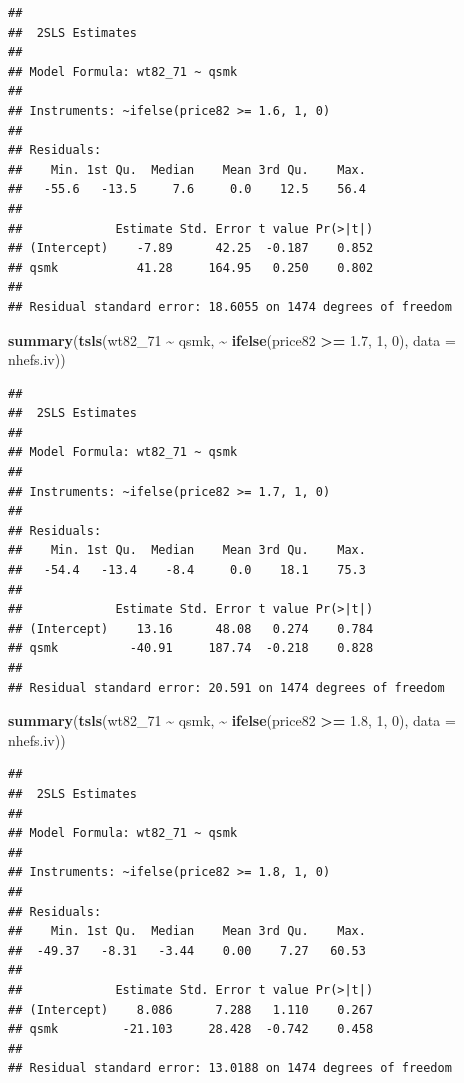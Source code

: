 \documentclass[
  10pt,
]{book}
\newenvironment{Shaded}{\begin{snugshade}}{\end{snugshade}}
\newcommand{\DataTypeTok}[1]{\textcolor[rgb]{0.13,0.29,0.53}{#1}}
\newcommand{\DecValTok}[1]{\textcolor[rgb]{0.00,0.00,0.81}{#1}}
\newcommand{\FloatTok}[1]{\textcolor[rgb]{0.00,0.00,0.81}{#1}}
\newcommand{\KeywordTok}[1]{\textcolor[rgb]{0.13,0.29,0.53}{\textbf{#1}}}
\newcommand{\NormalTok}[1]{#1}
\newcommand{\OperatorTok}[1]{\textcolor[rgb]{0.81,0.36,0.00}{\textbf{#1}}}
\newcommand{\StringTok}[1]{\textcolor[rgb]{0.31,0.60,0.02}{#1}}
\begin{document}
\begin{verbatim}
## 
##  2SLS Estimates
## 
## Model Formula: wt82_71 ~ qsmk
## 
## Instruments: ~ifelse(price82 >= 1.6, 1, 0)
## 
## Residuals:
##    Min. 1st Qu.  Median    Mean 3rd Qu.    Max. 
##   -55.6   -13.5     7.6     0.0    12.5    56.4 
## 
##             Estimate Std. Error t value Pr(>|t|)
## (Intercept)    -7.89      42.25  -0.187    0.852
## qsmk           41.28     164.95   0.250    0.802
## 
## Residual standard error: 18.6055 on 1474 degrees of freedom
\end{verbatim}

\begin{Shaded}
\begin{Highlighting}[]
\KeywordTok{summary}\NormalTok{(}\KeywordTok{tsls}\NormalTok{(wt82\_}\DecValTok{71} \OperatorTok{\textasciitilde{}}\StringTok{ }\NormalTok{qsmk, }\OperatorTok{\textasciitilde{}}\StringTok{ }\KeywordTok{ifelse}\NormalTok{(price82 }\OperatorTok{\textgreater{}=}\StringTok{ }\FloatTok{1.7}\NormalTok{, }\DecValTok{1}\NormalTok{, }\DecValTok{0}\NormalTok{), }\DataTypeTok{data =}\NormalTok{ nhefs.iv))}
\end{Highlighting}
\end{Shaded}

\begin{verbatim}
## 
##  2SLS Estimates
## 
## Model Formula: wt82_71 ~ qsmk
## 
## Instruments: ~ifelse(price82 >= 1.7, 1, 0)
## 
## Residuals:
##    Min. 1st Qu.  Median    Mean 3rd Qu.    Max. 
##   -54.4   -13.4    -8.4     0.0    18.1    75.3 
## 
##             Estimate Std. Error t value Pr(>|t|)
## (Intercept)    13.16      48.08   0.274    0.784
## qsmk          -40.91     187.74  -0.218    0.828
## 
## Residual standard error: 20.591 on 1474 degrees of freedom
\end{verbatim}

\begin{Shaded}
\begin{Highlighting}[]
\KeywordTok{summary}\NormalTok{(}\KeywordTok{tsls}\NormalTok{(wt82\_}\DecValTok{71} \OperatorTok{\textasciitilde{}}\StringTok{ }\NormalTok{qsmk, }\OperatorTok{\textasciitilde{}}\StringTok{ }\KeywordTok{ifelse}\NormalTok{(price82 }\OperatorTok{\textgreater{}=}\StringTok{ }\FloatTok{1.8}\NormalTok{, }\DecValTok{1}\NormalTok{, }\DecValTok{0}\NormalTok{), }\DataTypeTok{data =}\NormalTok{ nhefs.iv))}
\end{Highlighting}
\end{Shaded}

\begin{verbatim}
## 
##  2SLS Estimates
## 
## Model Formula: wt82_71 ~ qsmk
## 
## Instruments: ~ifelse(price82 >= 1.8, 1, 0)
## 
## Residuals:
##    Min. 1st Qu.  Median    Mean 3rd Qu.    Max. 
##  -49.37   -8.31   -3.44    0.00    7.27   60.53 
## 
##             Estimate Std. Error t value Pr(>|t|)
## (Intercept)    8.086      7.288   1.110    0.267
## qsmk         -21.103     28.428  -0.742    0.458
## 
## Residual standard error: 13.0188 on 1474 degrees of freedom
\end{verbatim}
\end{document}
